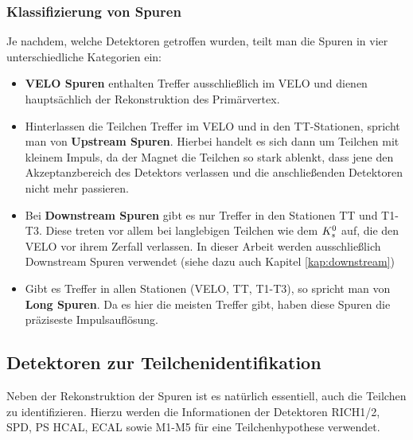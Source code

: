 \subsubsection{Klassifizierung von Spuren} \label{kap:spurklassen}
Je nachdem, welche Detektoren getroffen wurden, teilt man die Spuren in vier unterschiedliche Kategorien ein:
\begin{itemize}
\item \textbf{VELO Spuren} enthalten Treffer ausschließlich im VELO und dienen hauptsächlich der Rekonstruktion des Primärvertex.
\item Hinterlassen die Teilchen Treffer im VELO und in den TT-Stationen, spricht man von \textbf{Upstream Spuren}. Hierbei handelt es sich dann um Teilchen mit kleinem Impuls, da der Magnet die Teilchen so stark ablenkt, dass jene den Akzeptanzbereich des Detektors verlassen und die anschließenden Detektoren nicht mehr passieren.
\item Bei \textbf{Downstream Spuren} gibt es nur Treffer in den Stationen TT und T1-T3. Diese treten vor allem bei langlebigen Teilchen wie dem $K_s^0$ auf, die den VELO vor ihrem Zerfall verlassen. In dieser Arbeit werden ausschließlich Downstream Spuren verwendet (siehe dazu auch Kapitel \ref{kap:downstream})
\item Gibt es Treffer in allen Stationen (VELO, TT, T1-T3), so spricht man von \textbf{Long Spuren}. Da es hier die meisten Treffer gibt, haben diese Spuren die präziseste Impulsauflösung. \cite{thesis_linn}
\end{itemize}

\subsection{Detektoren zur Teilchenidentifikation}
Neben der Rekonstruktion der Spuren ist es natürlich essentiell, auch die Teilchen zu identifizieren. Hierzu werden die Informationen der Detektoren RICH1/2, SPD, PS HCAL, ECAL sowie M1-M5 für eine Teilchenhypothese verwendet.

